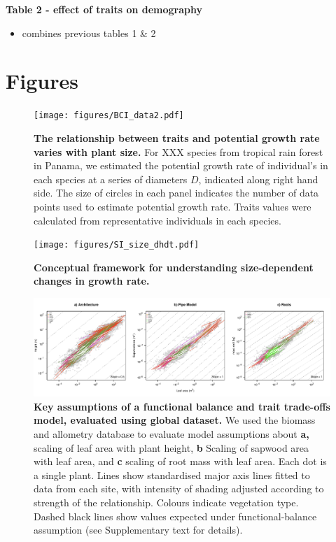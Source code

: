 \documentclass[12pt, a4paper]{article}
\makeatletter
\def\maxwidth{\ifdim\Gin@nat@width>\linewidth\linewidth
\else\Gin@nat@width\fi}
\let\Oldincludegraphics\includegraphics
\renewcommand{\includegraphics}[1]{\Oldincludegraphics[width=\maxwidth]{#1}}
\makeatother
\begin{document}
\textbf{Table 2 - effect of traits on demography}

\begin{itemize}
\itemsep1pt\parskip0pt
\item
  combines previous tables 1 \& 2
\end{itemize}


\newpage

\section*{Figures}\label{figures}

\begin{figure}[htbp]
\centering
\texttt{[image: figures/BCI\_data2.pdf]}
\caption{\textbf{The relationship between traits and potential growth
rate varies with plant size.} For XXX species from tropical rain forest
in Panama, we estimated the potential growth rate of individual's in
each species at a series of diameters \(D\), indicated along right hand
side. The size of circles in each panel indicates the number of data
points used to estimate potential growth rate. Traits values were
calculated from representative individuals in each species.
\label{f-BCI}}
\end{figure}

\newpage

\begin{figure}[htbp]
\centering
\texttt{[image: figures/SI\_size\_dhdt.pdf]}
\caption{\textbf{Conceptual framework for understanding size-dependent
changes in growth rate.} \label{f-conceptual}}
\end{figure}

\newpage

\begin{figure}[htbp]
\centering
\includegraphics{figs/allometry.pdf}
\caption{\textbf{Key assumptions of a functional balance and trait
trade-offs model, evaluated using global dataset.} We used the biomass and
allometry database to evaluate model assumptions about \textbf{a,}
scaling of leaf area with plant height, \textbf{b} Scaling of sapwood
area with leaf area, and \textbf{c} scaling of root mass with leaf area.
Each dot is a single plant. Lines show standardised major axis lines
fitted to data from each site, with intensity of shading adjusted
according to strength of the relationship. Colours indicate vegetation
type. Dashed black lines show values expected under functional-balance
assumption (see Supplementary text for details). \label{f-assumptions}}
\end{figure}
\end{document}
